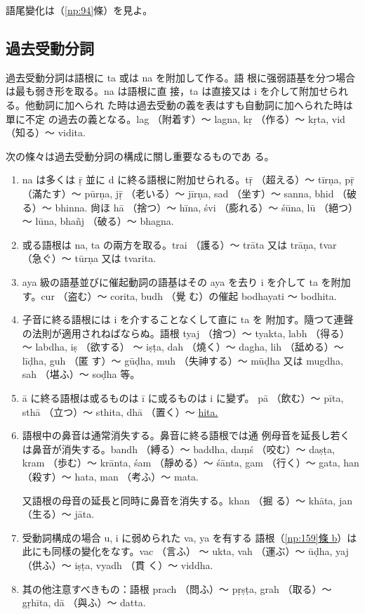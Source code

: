 語尾變化は（\ref{np:94}條）を見よ。

\subsection{過去受動分詞}
\numberParagraph
過去受動分詞は語根に ta 或は na を附加して作る。語
根に强弱語基を分つ場合は最も弱き形を取る。na は語根に直
接，ta は直接又は i を介して附加せられる。他動詞に加へられ
た時は過去受動の義を表はすも自動詞に加へられた時は單に不定
の過去の義となる。lag （附着す）～ lagna, kṛ （作る）～ kṛta, vid
（知る）～ vidita.

\numberParagraph \label{np:179}
次の條々は過去受動分詞の構成に關し重要なるものであ
る。
\begin{enumerate}[label=(\alph*)]
\item na は多くは ṝ 並に d に終る語根に附加せられる。tṝ
（超える）～ tīrṇa, pṝ （滿たす）～ pūrṇa, jṝ （老いる）～
jīrṇa, sad （坐す）～ sanna, bhid （破る）～ bhinna. 尙ほ
hā （捨つ）～ hīna, śvi （膨れる）～ śūna, lū （絕つ）～ lūna,
bhañj （破る）～ bhagna.
\item 或る語根は na, ta の兩方を取る。trai （護る）～ trāta
又は trāṇa, tvar （急ぐ）～ tūrṇa 又は tvarita.
\item aya 級の語基並びに催起動詞の語基はその aya を去り
i を介して ta を附加す。cur （盗む）～ corita, budh （覺
む）の催起 bodhayati ～ bodhita.
\item 子音に終る語根には i を介することなくして直に ta を
附加す。隨つて連聲の法則が適用されねばならぬ。語根
tyaj （捨つ）～ tyakta, labh （得る）～ labdha, iṣ （欲する）
～ iṣṭa, dah （燒く）～ dagha, lih （䑛める）～ līḍha, guh （匿
す）～ gūḍha, muh （失神する）～ mūḍha 又は mugdha, sah
（堪ふ）～ soḍha 等。
\item ā に終る語根は或るものは ī に或るものは i に變ず。
pā （飲む）～ pīta, sthā （立つ）～ sthita, dhā （置く）～ \underline{hita.}
\item 語根中の鼻音は通常消失する。鼻音に終る語根では通
例母音を延長し若くは鼻音が消失する。bandh （縛る）～
baddha, daṃś （咬む）～ daṣṭa, kram （歩む）～ krānta, śam
（靜める）～ śānta, gam （行く）～ gata, han （殺す）～ hata,
man （考ふ）～ mata.

又語根の母音の延長と同時に鼻音を消失する。khan （掘
る）～ khāta, jan （生る）～ jāta.
\item 受動詞構成の場合 u, i に弱められた va, ya を有する
語根（\underline{\ref{np:159}條 b}）は此にも同樣の變化をなす。vac （言ふ）
～ ukta, vah （運ぶ）～ ūḍha, yaj （供ふ）～ iṣṭa, vyadh （貫
く）～ viddha.
\item 其の他注意すべきもの：語根 prach （問ふ）～ pṛṣṭa,
grah （取る）～ gṛhīta, dā （與ふ）～ datta.
\end{enumerate}

